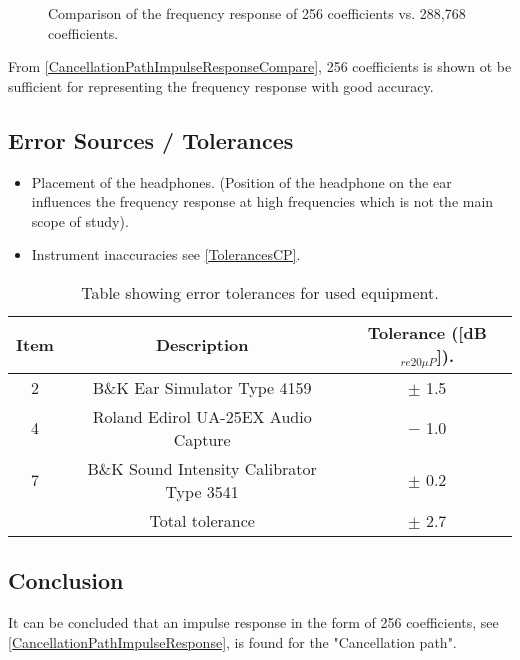 \begin{figure}[H]
	\centering
	
	\caption{Comparison of the frequency response of 256 coefficients vs. 288,768 coefficients.}
	\label{CancellationPathImpulseResponseCompare}
\end{figure}

From \autoref{CancellationPathImpulseResponseCompare}, 256 coefficients is shown ot be sufficient for representing the frequency response with good accuracy. 

\subsection{Error Sources / Tolerances}
\begin{itemize}
	\item Placement of the headphones. (Position of the headphone on the ear  influences the frequency response at high frequencies which is not the main scope of study). 
	\item Instrument inaccuracies see \autoref{TolerancesCP}.
\end{itemize}

\begin{table}[H]
	\centering
	\begin{tabular}{ c c c } \toprule
		{Item}	& 		{Description} 	& {Tolerance ([dB$_{re20\mu P}$])}.	 \\ \bottomrule 
		2	&	B\&K Ear Simulator Type 4159				& $\pm$ 1.5 \cite{BKEarTol} 	\\
		4	&	Roland Edirol UA-25EX Audio Capture			& $-$ 1.0 \cite{EdirolTol}	\\
		7	&	B\&K Sound Intensity Calibrator Type 3541	& $\pm$ 0.2	\cite{BKPistonTol} \\ \bottomrule
			&	Total tolerance								& $\pm$ 2.7	\\ \bottomrule	
	\end{tabular}
	\caption{Table showing error tolerances for used equipment.}
	\label{TolerancesCP}
\end{table}

\subsection{Conclusion}
It can be concluded that an impulse response in the form of 256 coefficients, see \autoref{CancellationPathImpulseResponse}, is found for the "Cancellation path". %

